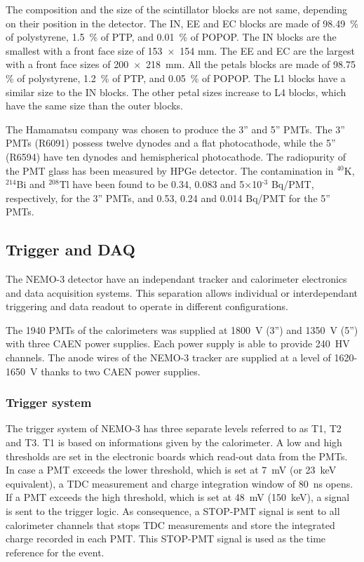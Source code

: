 \documentclass[main.tex]{subfiles}
\begin{document}
\NI The composition and the size of the scintillator blocks are not same, depending on their position in the detector. The IN, EE and EC blocks are made of 98.49~\% of polystyrene, 1.5~\% of PTP, and 0.01~\% of POPOP. The IN blocks are the smallest with a front face size of 153~$\times$~154 mm. The EE and EC are the largest with a front face sizes of 200~$\times$~218~mm. All the petals blocks are made of 98.75 \% of polystyrene, 1.2~\% of PTP, and 0.05~\% of POPOP. The L1 blocks have a similar size to the IN blocks. The other petal sizes increase to L4 blocks, which have the same size than the outer blocks. 


\bigskip


\NI The Hamamatsu company was chosen to produce the 3'' and 5'' PMTs. The 3'' PMTs (R6091) possess twelve dynodes and a flat photocathode, while the 5'' (R6594) have ten dynodes and hemispherical photocathode. The radiopurity of the PMT glass has been measured by HPGe detector. The contamination in $^{\text{40}}$K, $^{\text{214}}$Bi and $^{\text{208}}$Tl have been found to be 0.34, 0.083 and 5$\times$10$^{\text{-3}}$ Bq/PMT, respectively, for the 3'' PMTs, and 0.53, 0.24 and 0.014 Bq/PMT for the 5'' PMTs.


\FloatBarrier


\subsection{Trigger and DAQ}\label{sec:triggerAndDAQ}


\NI The NEMO-3 detector have an independant tracker and calorimeter electronics and data acquisition systems. This separation allows individual or interdependant triggering and data readout to operate in different configurations. 


\bigskip


\NI The 1940 PMTs of the calorimeters was supplied at 1800~V (3'') and 1350~V (5'') with three CAEN power supplies. Each power supply is able to provide 240~HV channels. The anode wires of the NEMO-3 tracker are supplied at a level of 1620-1650~V thanks to two CAEN power supplies. 


\subsubsection{Trigger system}


\NI The trigger system of NEMO-3 has three separate levels referred to as T1, T2 and T3. T1 is based on informations given by the calorimeter. A low and high thresholds are set in the electronic boards which read-out data from the PMTs. In case a PMT exceeds the lower threshold, which is set at 7~mV (or 23~keV equivalent), a TDC measurement and charge integration window of 80~ns opens. If a PMT exceeds the high threshold, which is set at 48~mV (150~keV), a signal is sent to the trigger logic. As consequence, a STOP-PMT signal is sent to all calorimeter channels that stops TDC measurements and store the integrated charge recorded in each PMT. This STOP-PMT signal is used as the time reference for the event.
\end{document}
